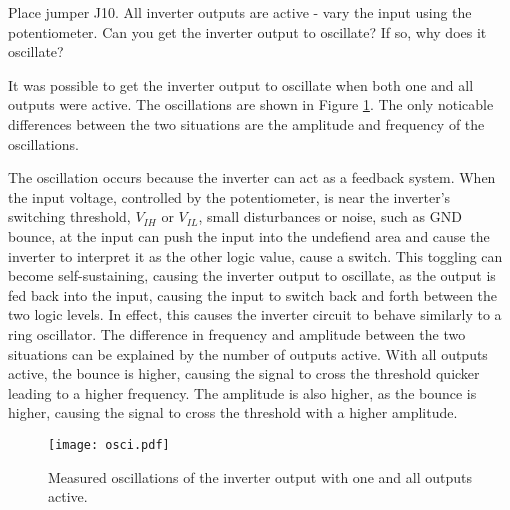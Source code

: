 \documentclass[../main.tex]{subfiles}
\begin{document}
\vspace{10pt}

Place jumper J10. All inverter outputs are active - vary the input using the potentiometer. Can you get the inverter output to oscillate? If so, why does it oscillate?

\solution

It was possible to get the inverter output to oscillate when both one and all outputs were active. The oscillations are shown in Figure \ref{fig:inverter_oscillation}. The only noticable differences between the two situations are the amplitude and frequency of the oscillations.

The oscillation occurs because the inverter can act as a feedback system. When the input voltage, controlled by the potentiometer, is near the inverter's switching threshold, $V_{IH}$ or $V_{IL}$, small disturbances or noise, such as GND bounce, at the input can push the input into the undefiend area and cause the inverter to interpret it as the other logic value, cause a switch. This toggling can become self-sustaining, causing the inverter output to oscillate, as the output is fed back into the input, causing the input to switch back and forth between the two logic levels. In effect, this causes the inverter circuit to behave similarly to a ring oscillator. The difference in frequency and amplitude between the two situations can be explained by the number of outputs active. With all outputs active, the bounce is higher, causing the signal to cross the threshold quicker leading to a higher frequency. The amplitude is also higher, as the bounce is higher, causing the signal to cross the threshold with a higher amplitude.

\begin{figure}[H]
    \centering
    \texttt{[image: osci.pdf]}
    \caption{Measured oscillations of the inverter output with one and all outputs active.}
    \label{fig:inverter_oscillation}
\end{figure}
\end{document}
